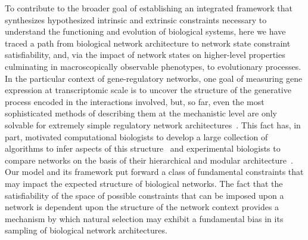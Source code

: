 To contribute to the broader goal of establishing an integrated framework that synthesizes hypothesized intrinsic and extrinsic constraints necessary to understand the functioning and evolution of biological systems, here we have traced a path from biological network architecture to network state constraint satisfiability, and, via the impact of network states on higher-level properties culminating in macroscopically observable phenotypes, to evolutionary processes. In the particular context of gene-regulatory networks, one goal of measuring gene expression at transcriptomic scale is to uncover the structure of the generative process encoded in the interactions involved, but, so far, even the most sophisticated methods of describing them at the mechanistic level are only solvable for extremely simple regulatory network architectures~\cite{Walczak2009,Mugler2009}. This fact has, in part, motivated computational biologists to develop a large collection of algorithms to infer aspects of this structure~\cite{Anastassiou2007,DeSmet2010} and experimental biologists to compare networks on the basis of their hierarchical and modular architecture~\cite{Ideker2012}. Our model and its framework put forward a class of fundamental constraints that may impact the expected structure of biological networks. The fact that the satisfiability of the space of possible constraints that can be imposed upon a network is dependent upon the structure of the network context provides a mechanism by which natural selection may exhibit a fundamental bias in its sampling of biological network architectures.

